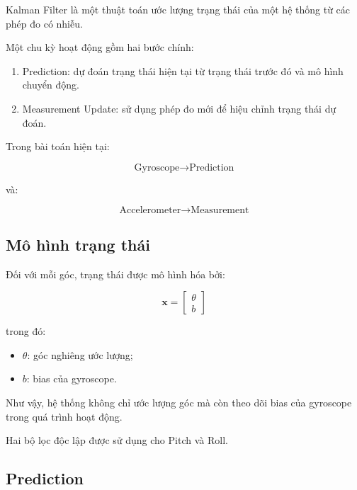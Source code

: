 \documentclass[a4paper,12pt]{report}
\begin{document}
Kalman Filter là một thuật toán ước lượng trạng thái của một hệ thống từ các phép đo có nhiễu.

Một chu kỳ hoạt động gồm hai bước chính:

\begin{enumerate}
    \item Prediction: dự đoán trạng thái hiện tại từ trạng thái trước đó
    và mô hình chuyển động.
    \item Measurement Update: sử dụng phép đo mới để hiệu chỉnh trạng thái
    dự đoán.
\end{enumerate}

Trong bài toán hiện tại:

\begin{equation}
\text{Gyroscope}
\rightarrow
\text{Prediction}
\end{equation}

và:

\begin{equation}
\text{Accelerometer}
\rightarrow
\text{Measurement}
\end{equation}

\subsection{Mô hình trạng thái}

Đối với mỗi góc, trạng thái được mô hình hóa bởi:

\begin{equation}
\mathbf{x}
=
\begin{bmatrix}
\theta \\
b
\end{bmatrix}
\end{equation}

trong đó:

\begin{itemize}
    \item $\theta$: góc nghiêng ước lượng;
    \item $b$: bias của gyroscope.
\end{itemize}

Như vậy, hệ thống không chỉ ước lượng góc mà còn theo dõi bias của gyroscope trong quá trình hoạt động.

Hai bộ lọc độc lập được sử dụng cho Pitch và Roll.


\subsection{Prediction}
\end{document}
